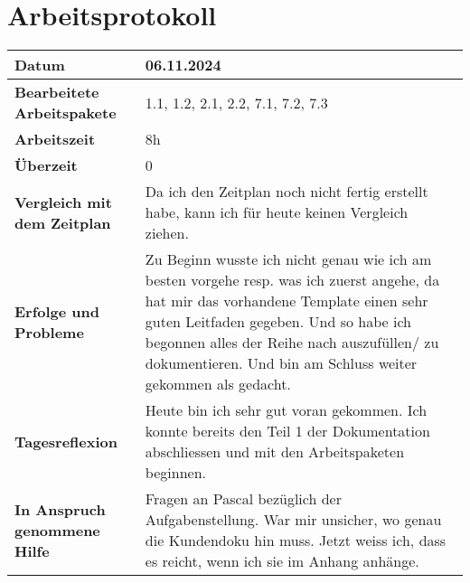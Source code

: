 \chapter{Arbeitsprotokoll}\label{ch:arbeitsprotokoll}
\renewcommand{\arraystretch}{1.5}
\begin{longtable}{p{}|p{}}
    \hline
    \textbf{Datum}                       & 06.11.2024\\
    \hline
    \textbf{Bearbeitete Arbeitspakete}   & 1.1, 1.2, 2.1, 2.2, 7.1, 7.2, 7.3\\
    \hline
    \textbf{Arbeitszeit}                 & 8h \\
    \hline
    \textbf{Überzeit}                    & 0 \\
    \hline
    \textbf{Vergleich mit dem Zeitplan}  & Da ich den Zeitplan noch nicht fertig erstellt habe, kann ich für heute keinen Vergleich ziehen. \\
    \hline
    \textbf{Erfolge und Probleme}        & Zu Beginn wusste ich nicht genau wie ich am besten vorgehe resp. was ich zuerst angehe, da hat mir das vorhandene Template einen sehr guten Leitfaden gegeben. Und so habe ich begonnen alles der Reihe nach auszufüllen/ zu dokumentieren. Und bin am Schluss weiter gekommen als gedacht.\\
    \hline
    \textbf{Tagesreflexion}              & Heute bin ich sehr gut voran gekommen. Ich konnte bereits den Teil 1 der Dokumentation abschliessen und mit den Arbeitspaketen beginnen.
    \\
    \hline
    \textbf{In Anspruch genommene Hilfe} & Fragen an Pascal bezüglich der Aufgabenstellung. War mir unsicher, wo genau die Kundendoku hin muss. Jetzt weiss ich, dass es reicht, wenn ich sie im Anhang anhänge.\\
    \hline
\end{longtable}\label{tab:arbeitsprotokoll-tag1} 

\newpage

